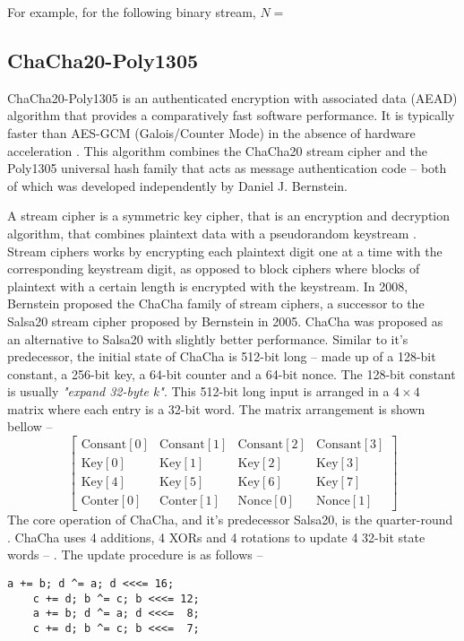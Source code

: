 \documentclass{article}
\begin{document}
For example, for the following binary stream, $N=$
\subsection{ChaCha20-Poly1305}
\label{sec:chacha20}
ChaCha20-Poly1305 is an authenticated encryption with associated data (AEAD) algorithm that provides a comparatively fast software performance. It is typically faster than AES-GCM (Galois/Counter Mode) in the absence of hardware acceleration \cite{rfc7539}. This algorithm combines the ChaCha20 stream cipher \cite{bernstein2008chacha} and the Poly1305 \cite{bernstein2005poly1305} universal hash family that acts as message authentication code -- both of which was developed independently by Daniel J. Bernstein.

A stream cipher is a symmetric key cipher, that is an encryption and decryption algorithm, that combines plaintext data with a pseudorandom keystream \cite{robshaw1995stream}. Stream ciphers works by encrypting each plaintext digit one at a time with the corresponding keystream digit, as opposed to block ciphers where blocks of plaintext with a certain length is encrypted with the keystream. In 2008, Bernstein proposed the ChaCha family of stream ciphers, a successor to the Salsa20 stream cipher \cite{bernstein2005salsa20} proposed by Bernstein in 2005. ChaCha was proposed as an alternative to Salsa20 \cite{bernstein2008chachaFamily} with slightly better performance. Similar to it's predecessor, the initial state of ChaCha is 512-bit long -- made up of a 128-bit constant, a 256-bit key, a 64-bit counter and a 64-bit nonce. The 128-bit constant is usually \textit{"expand 32-byte k"}. This 512-bit long input is arranged in a $4\times4$ matrix where each entry is a 32-bit word. The matrix arrangement is shown bellow --
\begin{equation}\label{initialState}
    \left[
        \begin{array}{cccc}
            \text{Consant}[0] & \text{Consant}[1] & \text{Consant}[2] & \text{Consant}[3] \\
            \text{Key}[0]     & \text{Key}[1]     & \text{Key}[2]     & \text{Key}[3]     \\
            \text{Key}[4]     & \text{Key}[5]     & \text{Key}[6]     & \text{Key}[7]     \\
            \text{Conter}[0]  & \text{Conter}[1]  & \text{Nonce}[0]   & \text{Nonce}[1]
        \end{array}
        \right]
\end{equation}
The core operation of ChaCha, and it's predecessor Salsa20, is the quarter-round . ChaCha uses 4 additions, 4 XORs and 4 rotations to update 4 32-bit state words -- . The update procedure is as follows --
\begin{lstlisting}[basicstyle=\ttfamily,frame=none]
    a += b; d ^= a; d <<<= 16;
    c += d; b ^= c; b <<<= 12;
    a += b; d ^= a; d <<<=  8;
    c += d; b ^= c; b <<<=  7;
\end{lstlisting}
\end{document}
